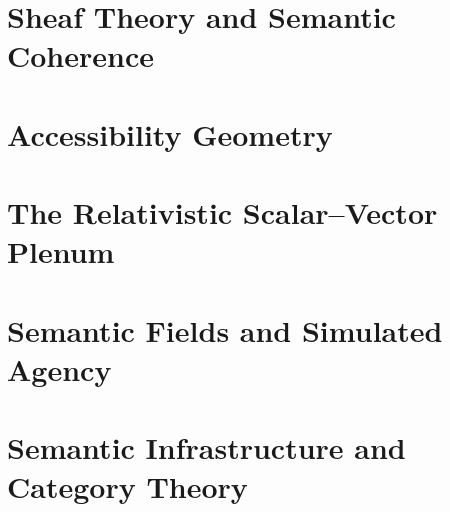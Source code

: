 \documentclass[
  12pt,
  twoside,
  openright,
  a4paper
]{book}
\begin{document}
\chapter{Sheaf Theory and Semantic Coherence}


\chapter{Accessibility Geometry}


\chapter{The Relativistic Scalar–Vector Plenum}


\chapter{Semantic Fields and Simulated Agency}


\chapter{Semantic Infrastructure and Category Theory}


\end{document}
